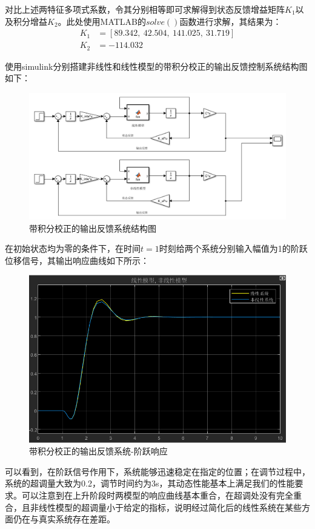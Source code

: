 \documentclass[UTF8]{article}
\begin{document}
对比上述两特征多项式系数，令其分别相等即可求解得到状态反馈增益矩阵$K_1$以及积分增益$K_2$。此处使用MATLAB的$solve()$函数进行求解，其结果为：
\begin{align*}
	K_1 &= [89.342,\ 42.504,\ 141.025,\ 31.719] \\
	K_2 &= -114.032
\end{align*}

使用simulink分别搭建非线性和线性模型的带积分校正的输出反馈控制系统结构图如下：
\begin{figure}[H]
    \centering %
    \includegraphics[width=.6\textwidth]{figure/倒立摆-积分校正-结构图.png}
    \caption{带积分校正的输出反馈系统结构图} %
\end{figure}

在初始状态均为零的条件下，在时间$t = 1$时刻给两个系统分别输入幅值为1的阶跃位移信号，其输出响应曲线如下所示：
\begin{figure}[H]
    \centering %
    \includegraphics[width=.6\textwidth]{figure/倒立摆-积分校正-阶跃响应.png}
    \caption{带积分校正的输出反馈系统-阶跃响应} %
\end{figure}
可以看到，在阶跃信号作用下，系统能够迅速稳定在指定的位置；在调节过程中，系统的超调量大致为0.2，调节时间约为3s，其动态性能基本上满足我们的性能要求。可以注意到在上升阶段时两模型的响应曲线基本重合，在超调处没有完全重合，且非线性模型的超调量小于给定的指标，说明经过简化后的线性系统在某些方面仍在与真实系统存在差距。
\end{document}
